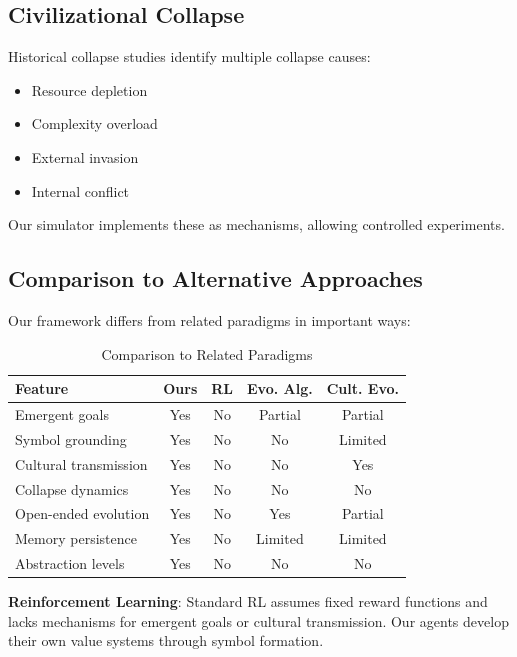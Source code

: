 \documentclass[11pt,a4paper]{article}
\begin{document}
\subsection{Civilizational Collapse}

Historical collapse studies \cite{tainter1988,diamond2005} identify multiple collapse causes:

\begin{itemize}
    \item Resource depletion
    \item Complexity overload
    \item External invasion
    \item Internal conflict
\end{itemize}

Our simulator implements these as mechanisms, allowing controlled experiments.

\subsection{Comparison to Alternative Approaches}

Our framework differs from related paradigms in important ways:

\begin{table}[htbp]
\centering
\caption{Comparison to Related Paradigms}
\label{tab:comparison}
\begin{tabular}{@{}lcccc@{}}
\toprule
\textbf{Feature} & \textbf{Ours} & \textbf{RL} & \textbf{Evo. Alg.} & \textbf{Cult. Evo.} \\
\midrule
Emergent goals & Yes & No & Partial & Partial \\
Symbol grounding & Yes & No & No & Limited \\
Cultural transmission & Yes & No & No & Yes \\
Collapse dynamics & Yes & No & No & No \\
Open-ended evolution & Yes & No & Yes & Partial \\
Memory persistence & Yes & No & Limited & Limited \\
Abstraction levels & Yes & No & No & No \\
\bottomrule
\end{tabular}
\end{table}

\textbf{Reinforcement Learning}: Standard RL assumes fixed reward functions and lacks mechanisms for emergent goals or cultural transmission. Our agents develop their own value systems through symbol formation.
\end{document}
